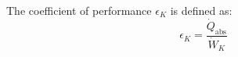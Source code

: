 The coefficient of performance \( \epsilon_K \) is defined as:  
\[
\epsilon_K = \frac{\dot{Q}_{\text{abs}}}{\dot{W}_K}
\]